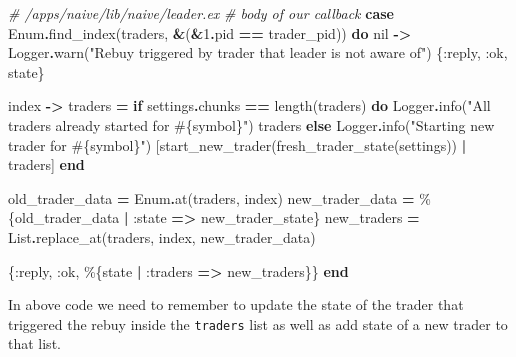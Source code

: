 \documentclass[
]{book}
\newenvironment{Shaded}{\begin{snugshade}}{\end{snugshade}}
\newcommand{\CommentTok}[1]{\textcolor[rgb]{0.56,0.35,0.01}{\textit{#1}}}
\newcommand{\ConstantTok}[1]{\textcolor[rgb]{0.00,0.00,0.00}{#1}}
\newcommand{\ControlFlowTok}[1]{\textcolor[rgb]{0.13,0.29,0.53}{\textbf{#1}}}
\newcommand{\DecValTok}[1]{\textcolor[rgb]{0.00,0.00,0.81}{#1}}
\newcommand{\KeywordTok}[1]{\textcolor[rgb]{0.13,0.29,0.53}{\textbf{#1}}}
\newcommand{\NormalTok}[1]{#1}
\newcommand{\OperatorTok}[1]{\textcolor[rgb]{0.81,0.36,0.00}{\textbf{#1}}}
\newcommand{\OtherTok}[1]{\textcolor[rgb]{0.56,0.35,0.01}{#1}}
\newcommand{\StringTok}[1]{\textcolor[rgb]{0.31,0.60,0.02}{#1}}
\newcommand{\VariableTok}[1]{\textcolor[rgb]{0.00,0.00,0.00}{#1}}
\begin{document}
\begin{Shaded}
\begin{Highlighting}[]
    \CommentTok{\# /apps/naive/lib/naive/leader.ex}
    \CommentTok{\# body of our callback}
    \KeywordTok{case} \ConstantTok{Enum}\OperatorTok{.}\NormalTok{find\_index(traders, }\OperatorTok{\&}\NormalTok{(}\OperatorTok{\&}\DecValTok{1}\OperatorTok{.}\NormalTok{pid }\OperatorTok{==}\NormalTok{ trader\_pid)) }\KeywordTok{do}
      \ConstantTok{nil} \OperatorTok{{-}\textgreater{}}
        \ConstantTok{Logger}\OperatorTok{.}\NormalTok{warn(}\StringTok{"Rebuy triggered by trader that leader is not aware of"}\NormalTok{)}
\NormalTok{        \{}\VariableTok{:reply}\NormalTok{, }\VariableTok{:ok}\NormalTok{, state\}}

\NormalTok{      index }\OperatorTok{{-}\textgreater{}}
\NormalTok{        traders }\OperatorTok{=}
          \ControlFlowTok{if}\NormalTok{ settings}\OperatorTok{.}\NormalTok{chunks }\OperatorTok{==}\NormalTok{ length(traders) }\KeywordTok{do}
            \ConstantTok{Logger}\OperatorTok{.}\NormalTok{info(}\StringTok{"All traders already started for }\OtherTok{\#\{}\NormalTok{symbol}\OtherTok{\}}\StringTok{"}\NormalTok{)}
\NormalTok{            traders}
          \ControlFlowTok{else}
            \ConstantTok{Logger}\OperatorTok{.}\NormalTok{info(}\StringTok{"Starting new trader for }\OtherTok{\#\{}\NormalTok{symbol}\OtherTok{\}}\StringTok{"}\NormalTok{)}
\NormalTok{            [start\_new\_trader(fresh\_trader\_state(settings)) }\OperatorTok{|}\NormalTok{ traders]}
          \KeywordTok{end}

\NormalTok{        old\_trader\_data }\OperatorTok{=} \ConstantTok{Enum}\OperatorTok{.}\NormalTok{at(traders, index)}
\NormalTok{        new\_trader\_data }\OperatorTok{=}\NormalTok{ \%\{old\_trader\_data }\OperatorTok{|} \VariableTok{:state} \OperatorTok{=\textgreater{}}\NormalTok{ new\_trader\_state\}}
\NormalTok{        new\_traders }\OperatorTok{=} \ConstantTok{List}\OperatorTok{.}\NormalTok{replace\_at(traders, index, new\_trader\_data)}

\NormalTok{        \{}\VariableTok{:reply}\NormalTok{, }\VariableTok{:ok}\NormalTok{, \%\{state }\OperatorTok{|} \VariableTok{:traders} \OperatorTok{=\textgreater{}}\NormalTok{ new\_traders\}\}}
    \KeywordTok{end}
\end{Highlighting}
\end{Shaded}

In above code we need to remember to update the state of the trader that triggered the rebuy inside the \texttt{traders} list as well as add state of a new trader to that list.
\end{document}
